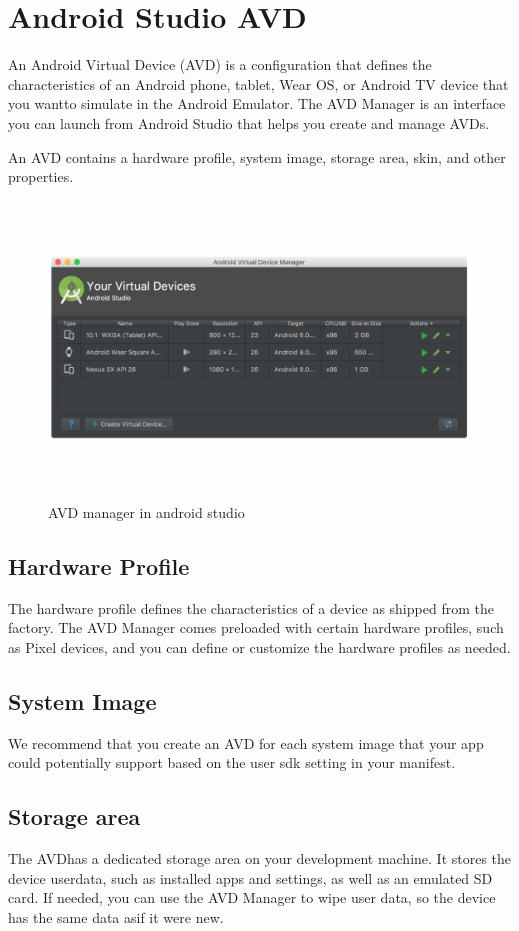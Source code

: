 \section{Android Studio AVD}
An Android Virtual Device (AVD) is a configuration that defines the characteristics of an Android phone, tablet, Wear OS, or Android TV device that you wantto simulate in the Android Emulator. The AVD Manager is an interface you can launch from Android Studio that helps you create and manage AVDs.

An AVD contains a hardware profile, system image, storage area, skin, and other properties.

\begin{figure}[!h]
	\centering
	\includegraphics[height=3.1in]{avd.PNG}
	\caption{AVD manager in android studio}
	
\end{figure} 

\subsection{Hardware Profile}
The hardware profile defines the characteristics of a device as shipped from the factory. The AVD Manager comes preloaded with certain hardware profiles, such as Pixel devices, and you can define or customize the hardware profiles as needed.

\subsection{System Image}

We recommend that you create an AVD for each system image that your app could potentially support based on the user sdk setting in your manifest.


\subsection{Storage area}
The AVDhas a dedicated storage area on your development machine. It stores the device userdata, such as installed apps and settings, as well as an emulated SD card. If needed, you can use the AVD Manager to wipe user data, so the device has the same data asif it were new.

